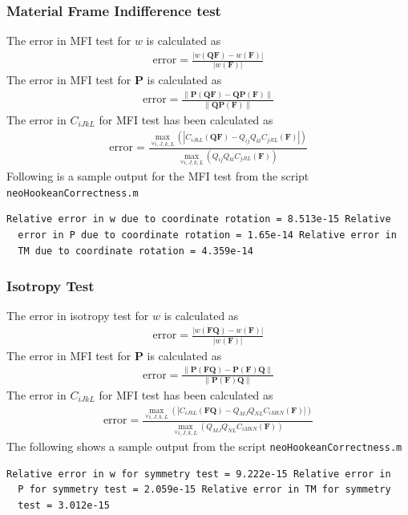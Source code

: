 \documentclass[../main.tex]{subfiles}
\begin{document}
\subsubsection{Material Frame Indifference test}
The error in MFI test for $w$ is calculated as
\begin{align*}
  \text{error} = \frac{|w(\mathbf{QF}) - w(\mathbf{F})|}{|w(\mathbf{F})|}
\end{align*}
The error in MFI test for $\mathbf{P}$ is calculated as
\begin{align*}
  \text{error} = \frac{\lVert\mathbf{P}(\mathbf{Q}\mathbf{F}) -\mathbf{Q}\mathbf{P}(\mathbf{F})\rVert}{\lVert\mathbf{Q}\mathbf{P}(\mathbf{F})\rVert}
\end{align*}
The error in $C_{iJkL}$ for MFI test has been calculated as
\begin{align*}
  \text{error} =\frac{\underset{\forall i,J,k,L}{\max}\left(|C_{iJkL}(\mathbf{Q}\mathbf{F})-Q_{ij}Q_{kl}C_{jJlL}(\mathbf{F})|\right)}{\underset{\forall i,J,k,L}{\max}\left(Q_{ij}Q_{kl}C_{jJlL}(\mathbf{F})\right)}
\end{align*}
Following is a sample output for the MFI test from the script
\texttt{neoHookeanCorrectness.m}
\begin{lstlisting}[frame=single]
  Relative error in w due to coordinate rotation = 8.513e-15 Relative
  error in P due to coordinate rotation = 1.65e-14 Relative error in
  TM due to coordinate rotation = 4.359e-14
\end{lstlisting}

\subsubsection{Isotropy Test}
The error in isotropy test for $w$ is calculated as
\begin{align*}
  \text{error} = \frac{|w(\mathbf{FQ}) - w(\mathbf{F})|}{|w(\mathbf{F})|}
\end{align*}
The error in MFI test for $\mathbf{P}$ is calculated as
\begin{align*}
  \text{error} = \frac{\lVert\mathbf{P}(\mathbf{F}\mathbf{Q}) -\mathbf{P}(\mathbf{F})\mathbf{Q}\rVert}{\lVert\mathbf{P}(\mathbf{F})\mathbf{Q}\rVert}
\end{align*}
The error in $C_{iJkL}$ for MFI test has been calculated as
\begin{align*}
  \text{error} =\frac{\underset{\forall i,J,k,L}{\max}\left(|C_{iJkL}(\mathbf{F}\mathbf{Q})-Q_{MJ}Q_{NL}C_{iMkN}(\mathbf{F})|\right)}{\underset{\forall i,J,k,L}{\max}\left(Q_{MJ}Q_{NL}C_{iMkN}(\mathbf{F})\right)}
\end{align*}
The following shows a sample output from the script
\texttt{neoHookeanCorrectness.m}
\begin{lstlisting}[frame=single]
  Relative error in w for symmetry test = 9.222e-15 Relative error in
  P for symmetry test = 2.059e-15 Relative error in TM for symmetry
  test = 3.012e-15
\end{lstlisting}
\end{document}
